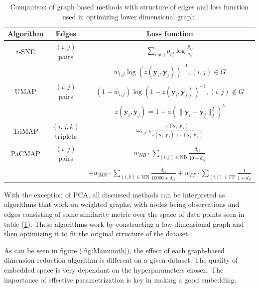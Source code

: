 \begin{table}[htb]
	\begin{center}
		\begin{tabular}{|c|c|c|}
			\hline
			Algorithm & Edges & Loss function \\
			\hline
			t-SNE & $(i, j)$ pairs & $\sum_{i\neq j} p_{ij} \log{\frac{p_{ij}}{q_{ij}}}$ \\
			\hline
			&&
			$\bar{w}_{i,j}\log \left( z(\mathbf{y}_i, \mathbf{y}_j) \right)^{-1}, (i,j) \in G$  \\
			UMAP& $(i, j)$ pairs & $\left(1-\bar{w}_{i,j}\right)\log \left( 1 - z(\mathbf{y}_i, \mathbf{y}_j) \right)^{-1}, (i,j) \notin G$ \\
			&& $z(\mathbf{y}_i, \mathbf{y}_j) = 1+a\left(\|\mathbf{y}_i-\mathbf{y}_j\|_2^{2}\right)^b $ \\
			\hline
			TriMAP & $(i, j, k)$ triplets &
			$\omega_{i,j,k}\frac{s(\mathbf{y}_i,\mathbf{y}_k)}{s(\mathbf{y}_i,\mathbf{y}_j)+s(\mathbf{y}_i,\mathbf{y}_k)}$ \\
			\hline
			PaCMAP & $(i, j)$ pairs &
			$w_{NB}\cdot\sum_{(i,j) \in \textrm{NB}}\frac{\tilde{d}_{ij}}{10 + \tilde{d}_{ij}}$ \\
			&& $+ w_{MN}\cdot\sum_{(i,k) \in \text{MN}}\frac{\tilde{d}_{ik}}{10000 + \tilde{d}_{ik}}+ w_{FP}\cdot\sum_{(i,l) \in \text{FP}}\frac{1}{1 + \tilde{d}_{il}}$ \\
			\hline
		\end{tabular}
		\caption{Comparison of graph based methods with structure of edges and loss function used in optimizing lower dimensional graph.}
		\label{tab:graph}
	\end{center}
\end{table}

With the exception of PCA, all discussed methods can be interpreted as algorithms that work on weighted graphs, with nodes being observations and edges consisting of some similarity metric over the space of data points seen in table (\ref{tab:graph}). These algorithms work by constructing a low-dimensional graph and then optimizing it to fit the original structure of the dataset.

As can be seen in figure (\ref{fig:Mammoth}), the effect of each graph-based dimension reduction algorithm is different on a given dataset. The quality of embedded space is very dependant on the hyperparameters chosen. The importance of effective parametrization is key in making a good embedding.

